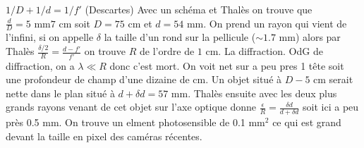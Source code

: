 \begin{solution}
\begin{questions}
    \questioncours $1/D+1/d=1/f'$ (Descartes)
    \question Avec un schéma et Thalès on trouve que $\frac{d}{D} ={5\text{ mm}}{7\text{ cm}}$ soit $D=75$ cm et $d=54$ mm.
    \question On prend un rayon qui vient de l’infini, si on appelle $\delta$ la taille d'un rond sur la pellicule ($\sim 1.7$ mm) alors par Thalès $\frac{\delta/2}{R}=\frac{d-f'}{f'}$ on trouve $R$ de l'ordre de $1$ cm.
    \question La diffraction. OdG de diffraction, on a $\lambda \ll R$ donc c'est mort.
    \question On voit net sur a peu pres 1 tête soit une profondeur de champ d'une dizaine de cm. Un objet situé à $D-5$ cm serait nette dans le plan situé à $d+\delta d = 57$ mm. Thalès ensuite avec les deux plus grands rayons venant de cet objet sur l'axe optique donne $\frac{\epsilon}{R} = \frac{\delta d}{d+\delta d}$ soit ici a peu près 0.5 mm. On trouve un elment photosensible de 0.1 mm$^2$ ce qui est grand devant la taille en pixel des caméras récentes.
\end{questions}
\end{solution}
